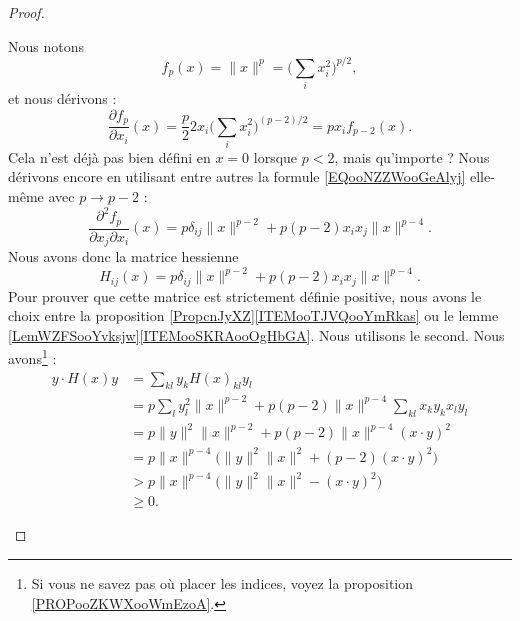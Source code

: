 \begin{proof}
	\begin{subproof}
		\spitem[La hessienne]
		Nous notons
		\begin{equation}
			f_p(x)=\| x \|^p=\big( \sum_ix_i^2 \big)^{p/2},
		\end{equation}
		et nous dérivons :
		\begin{equation}        \label{EQooNZZWooGeAlyj}
			\frac{ \partial f_p }{ \partial x_i }(x)=\frac{ p }{2}2x_i\big( \sum_ix_i^2 \big)^{(p-2)/2}=px_if_{p-2}(x).
		\end{equation}
		Cela n'est déjà pas bien défini en \( x=0\) lorsque \( p<2\), mais qu'importe ? Nous dérivons encore en utilisant entre autres la formule \eqref{EQooNZZWooGeAlyj} elle-même avec \( p\to p-2\) :
		\begin{equation}
			\frac{ \partial^2f_p  }{ \partial x_j\partial x_i }(x)=p\delta_{ij}\| x \|^{p-2}+p(p-2)x_ix_j \| x \|^{p-4}.
		\end{equation}
		Nous avons donc la matrice hessienne
		\begin{equation}
			H_{ij}(x)=p\delta_{ij}\| x \|^{p-2}+p(p-2)x_ix_j\| x \|^{p-4}.
		\end{equation}
		Pour prouver que cette matrice est strictement définie positive, nous avons le choix entre la proposition \ref{PropcnJyXZ}\ref{ITEMooTJVQooYmRkas} ou le lemme \ref{LemWZFSooYvksjw}\ref{ITEMooSKRAooOgHbGA}. Nous utilisons le second. Nous avons\footnote{Si vous ne savez pas où placer les indices, voyez la proposition \ref{PROPooZKWXooWmEzoA}.} :
		\begin{subequations}
			\begin{align}
				y\cdot H(x)y & = \sum_{kl}y_kH(x)_{kl}y_l                                                                      \\
				             & = p\sum_ly_l^2\| x \|^{p-2}+p(p-2)\| x \|^{p-4}\sum_{kl}x_ky_kx_ly_l                            \\
				             & = p\| y \|^2\| x \|^{p-2}+p(p-2)\| x \|^{p-4}(x\cdot y)^2                                       \\
				             & = p\| x \|^{p-4}\big( \| y \|^2\| x \|^2+(p-2)(x\cdot y)^2 \big)                                \\
				             & > p\| x \|^{p-4}\big( \| y \|^2\| x \|^2-(x\cdot y)^2 \big)         \label{SUBEQooUSZOooCqgWPE} \\
				             & \geq  0           \label{SUBEQooBXQKooZcarVv}.
			\end{align}
		\end{subequations}

\end{subproof}
\end{proof}
